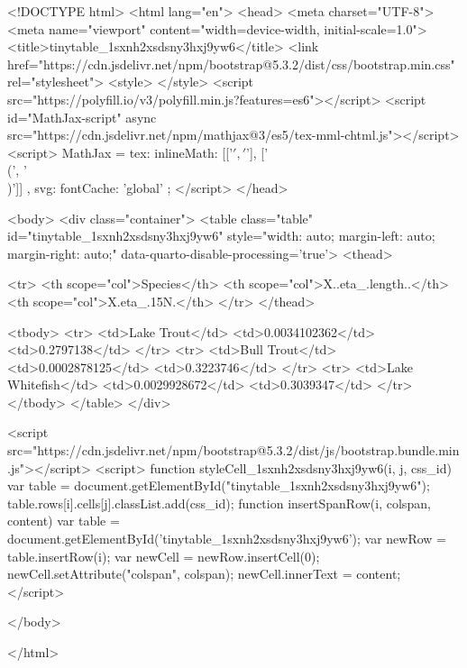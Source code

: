 <!DOCTYPE html> 
<html lang="en">
  <head>
    <meta charset="UTF-8">
    <meta name="viewport" content="width=device-width, initial-scale=1.0">
    <title>tinytable_1sxnh2xsdsny3hxj9yw6</title>
    <link href="https://cdn.jsdelivr.net/npm/bootstrap@5.3.2/dist/css/bootstrap.min.css" rel="stylesheet">
    <style>
    </style>
    <script src="https://polyfill.io/v3/polyfill.min.js?features=es6"></script>
    <script id="MathJax-script" async src="https://cdn.jsdelivr.net/npm/mathjax@3/es5/tex-mml-chtml.js"></script>
    <script>
    MathJax = {
      tex: {
        inlineMath: [['$', '$'], ['\\(', '\\)']]
      },
      svg: {
        fontCache: 'global'
      }
    };
    </script>
  </head>

  <body>
    <div class="container">
      <table class="table" id="tinytable_1sxnh2xsdsny3hxj9yw6" style="width: auto; margin-left: auto; margin-right: auto;" data-quarto-disable-processing='true'>
        <thead>
        
              <tr>
                <th scope="col">Species</th>
                <th scope="col">X..eta_.length..</th>
                <th scope="col">X.eta_.15N.</th>
              </tr>
        </thead>
        
        <tbody>
                <tr>
                  <td>Lake Trout</td>
                  <td>0.0034102362</td>
                  <td>0.2797138</td>
                </tr>
                <tr>
                  <td>Bull Trout</td>
                  <td>0.0002878125</td>
                  <td>0.3223746</td>
                </tr>
                <tr>
                  <td>Lake Whitefish</td>
                  <td>0.0029928672</td>
                  <td>0.3039347</td>
                </tr>
        </tbody>
      </table>
    </div>

    <script src="https://cdn.jsdelivr.net/npm/bootstrap@5.3.2/dist/js/bootstrap.bundle.min.js"></script>
    <script>
    function styleCell_1sxnh2xsdsny3hxj9yw6(i, j, css_id) {
      var table = document.getElementById("tinytable_1sxnh2xsdsny3hxj9yw6");
      table.rows[i].cells[j].classList.add(css_id);
    }
    function insertSpanRow(i, colspan, content) {
      var table = document.getElementById('tinytable_1sxnh2xsdsny3hxj9yw6');
      var newRow = table.insertRow(i);
      var newCell = newRow.insertCell(0);
      newCell.setAttribute("colspan", colspan);
      newCell.innerText = content;
    }
    </script>

  </body>

</html>

